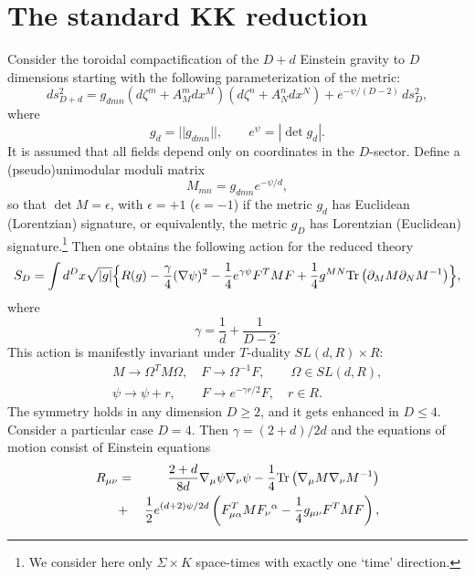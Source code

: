 \documentclass[a4paper,12pt]{article}
\def\Tr{{\rm Tr}}
\begin{document}
\section{The standard KK reduction}\label{SKKR}
Consider the toroidal compactification of the $D+d$ Einstein
gravity to $D$ dimensions starting with the following
parameterization of the metric:
\begin{equation}
ds_{D+d}^2 = g_{dmn}(d\zeta^m + A^m_M dx^M) (d\zeta^n + A^n_N
dx^N) + e^{-\psi/(D-2)} \, ds_{D}^2,
\end{equation}
where
\begin{equation}
g_{d} = ||g_{dmn}||, \qquad  e^\psi = |\det g_{d}|.
\end{equation}
It is assumed that all fields depend only on coordinates in the
$D$-sector. Define a (pseudo)unimodular moduli matrix
\begin{equation}\label{psi}
M_{mn} = g_{dmn} e^{-\psi/d},
\end{equation}
so that $\det M=\epsilon$, with $\epsilon=+1$ ($\epsilon=-1$) if
the metric $g_{d}$ has Euclidean (Lorentzian) signature, or
equivalently, the metric $g_{D}$ has Lorentzian (Euclidean)
signature.\footnote{We consider here only $\Sigma\times K$
space-times with exactly one `time' direction.} Then one obtains
the following action for the reduced theory
\begin{equation}\label{redth}
S_{D} = \int d^Dx \sqrt{|g|} \Bigl\{ R(g) -
\frac{\gamma}4(\nabla\psi)^2 - \frac14 e^{\gamma\psi} F^T M F +
\frac14 g^{MN} \Tr\left(\partial_M M \partial_N M^{-1}\right)
\Bigr\}, \label{SD}
\end{equation}
where
\begin{equation}
\gamma = \frac1d + \frac1{D-2}.
\end{equation}
This action is manifestly invariant under $T$-duality $SL(d,R)
\times R$:
\begin{eqnarray}
&& M \to \Omega^T M \Omega, \quad F \to \Omega^{-1} F,
  \qquad \Omega \in SL(d,R), \label{OMO} \\
&& \psi \to \psi + r, \qquad F \to e^{-\gamma r/2} F,
  \quad r \in R. \label{R}
\end{eqnarray}
The symmetry holds in any dimension $D\geq 2$, and it gets
enhanced in $D\leq 4$. Consider a particular case $D=4$. Then
$\gamma=(2+d)/2d$ and the equations of motion consist of Einstein
equations
\begin{eqnarray}
R_{\mu\nu} &=& \frac{2+d}{8d} \nabla_{\mu}\psi \nabla_{\nu}\psi -
\frac14 \Tr \left(\nabla_{\mu} M \nabla_{\nu} M^{-1}\right)
\nonumber \\
&+& \frac12 e^{(d+2)\psi/2d} \left(F^T_{\mu\alpha} M
F_\nu{}^\alpha - \frac14 g_{\mu\nu} F^T M F \right), \label{FE}
\end{eqnarray}
\end{document}
